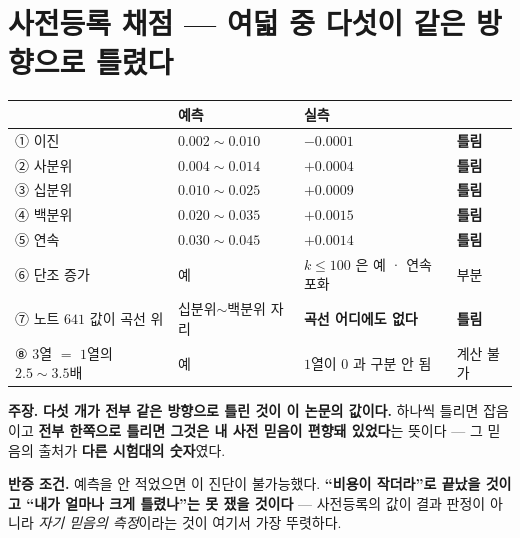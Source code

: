 \documentclass[10pt,a4paper]{article}
\newcommand{\claim}[2]{\begin{claimbox}\textbf{주장.} #1\par\smallskip
  \textcolor{gray!70}{\textbf{반증 조건.} #2}\end{claimbox}}
\begin{document}
\section{사전등록 채점 --- 여덟 중 다섯이 같은 방향으로 틀렸다}

\begin{center}
\begin{tabular}{llll}
\toprule
& 예측 & 실측 & \\
\midrule
① 이진 & $0.002 \sim 0.010$ & $-0.0001$ & \textbf{틀림} \\
② 사분위 & $0.004 \sim 0.014$ & $+0.0004$ & \textbf{틀림} \\
③ 십분위 & $0.010 \sim 0.025$ & $+0.0009$ & \textbf{틀림} \\
④ 백분위 & $0.020 \sim 0.035$ & $+0.0015$ & \textbf{틀림} \\
⑤ 연속 & $0.030 \sim 0.045$ & $+0.0014$ & \textbf{틀림} \\
⑥ 단조 증가 & 예 & $k{\leq}100$ 은 예 · 연속 포화 & 부분 \\
⑦ 노트 $641$ 값이 곡선 위 & 십분위$\sim$백분위 자리 & \textbf{곡선 어디에도 없다} & \textbf{틀림} \\
⑧ $3$열 $=$ $1$열의 $2.5{\sim}3.5$배 & 예 & $1$열이 $0$ 과 구분 안 됨 & 계산 불가 \\
\bottomrule
\end{tabular}
\end{center}

\claim{\textbf{다섯 개가 전부 같은 방향으로 틀린 것이 이 논문의 값이다.} 하나씩
틀리면 잡음이고 \textbf{전부 한쪽으로 틀리면 그것은 내 사전 믿음이 편향돼
있었다}는 뜻이다 --- 그 믿음의 출처가 \textbf{다른 시험대의 숫자}였다.}
{예측을 안 적었으면 이 진단이 불가능했다. \textbf{``비용이 작더라''로 끝났을 것이고
``내가 얼마나 크게 틀렸나''는 못 쟀을 것이다} --- 사전등록의 값이 결과 판정이
아니라 \emph{자기 믿음의 측정}이라는 것이 여기서 가장 뚜렷하다.}
\end{document}
